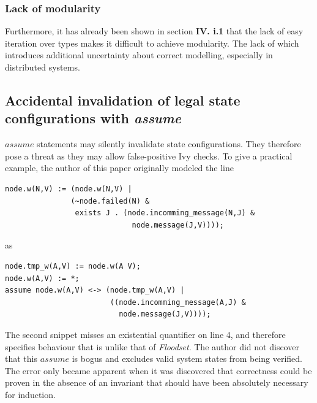 \documentclass[fleqn]{article}
\begin{document}
\subsubsection{Lack of modularity}
Furthermore, it has already been shown in section \textbf{IV. i.1} that the lack of easy iteration over types makes it difficult to achieve modularity. The lack of which introduces additional uncertainty about correct modelling, especially in distributed systems.


\subsection{Accidental invalidation of legal state configurations with \textit{assume}}
$assume$ statements may silently invalidate state configurations. They therefore pose a threat as they
may allow false-positive Ivy checks.
To give a practical example, the author of this paper originally modeled the line

\begin{mdframed}[nobreak=true, backgroundcolor=light-gray, roundcorner=10pt,leftmargin=1, rightmargin=1, innerleftmargin=15, innertopmargin=15,innerbottommargin=15, outerlinewidth=1, linecolor=light-gray]
\begin{lstlisting}
node.w(N,V) := (node.w(N,V) |
               (~node.failed(N) &
                exists J . (node.incomming_message(N,J) &
                             node.message(J,V))));
\end{lstlisting}
\end{mdframed}

\noindent as

\begin{mdframed}[nobreak=true, backgroundcolor=light-gray, roundcorner=10pt,leftmargin=1, rightmargin=1, innerleftmargin=15, innertopmargin=15,innerbottommargin=15, outerlinewidth=1, linecolor=light-gray]
\begin{lstlisting}
node.tmp_w(A,V) := node.w(A V);
node.w(A,V) := *;
assume node.w(A,V) <-> (node.tmp_w(A,V) |
                        ((node.incomming_message(A,J) &
                          node.message(J,V))));
\end{lstlisting}
\end{mdframed}
The second snippet misses an existential quantifier on line 4, and therefore specifies behaviour that is unlike that of \textit{Floodset}.  The author did not discover that this $assume$ is bogus and excludes valid system states from being verified. The error only became apparent when it was discovered that correctness could be proven in the absence of an invariant that should have been absolutely necessary for induction.
\end{document}
